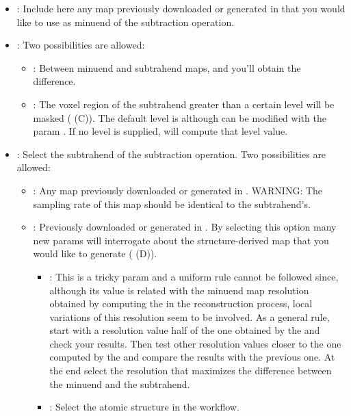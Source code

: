 \begin{itemize}
  \begin{itemize}
   \item {}: Include here any map previously downloaded or generated in \scipion that you would like to use as minuend of the subtraction operation.
   \item {}: Two possibilities are allowed:
    \begin{itemize}
    \item {}: Between minuend and subtrahend maps, and you'll obtain the difference.
    \item {}: The voxel region of the subtrahend greater than a certain level will be masked ( (C)). The default level is  although can be modified with the  param . If no level is supplied, \chimerax will compute that level value.
    \end{itemize}
   \item {}: Select the subtrahend of the subtraction operation. Two possibilities are allowed:
    \begin{itemize}
   \item {}: Any map previously downloaded or generated in \scipion. WARNING: The sampling rate of this map should be identical to the subtrahend's.
   \item {}: Previously downloaded or generated in \scipion. By selecting this option many new params will interrogate about the structure-derived map that you would like to generate ( (D)).
            \begin{itemize}
            \item {}: This is a tricky param and a uniform rule cannot be followed since, although its value is related with the minuend map resolution obtained by computing the  in the reconstruction process, local variations of this resolution seem to be involved. As a general rule, start with a resolution value half of the one obtained by the  and check your results. Then test other resolution values closer to the one computed by the  and compare the results with the previous one. At the end select the resolution that maximizes the difference between the minuend and the subtrahend.
            \item {}: Select the atomic structure in the \scipion workflow.

\end{itemize}
\end{itemize}
\end{itemize}
\end{itemize}
